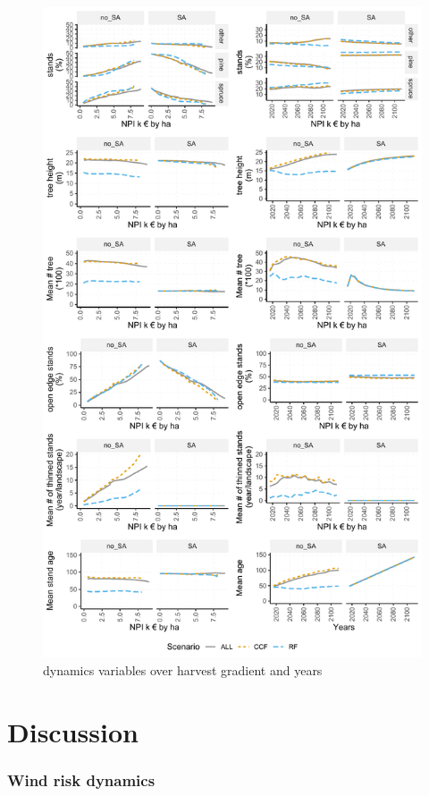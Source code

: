 \documentclass[]{elsarticle} %
\makeatletter
\def\maxwidth{\ifdim\Gin@nat@width>\linewidth\linewidth
\else\Gin@nat@width\fi}
\let\Oldincludegraphics\includegraphics
\renewcommand{\includegraphics}[1]{\Oldincludegraphics[width=\maxwidth]{#1}}
\makeatother
\begin{document}
\begin{figure}
\centering
\includegraphics{test_manus2_files/figure-latex/plot-dynamic-vars-1.pdf}
\caption{\label{fig:plot-dynamic-vars}dynamics variables over harvest
gradient and years}
\end{figure}

\section{Discussion}\label{discussion}

\subsubsection{Wind risk dynamics}\label{wind-risk-dynamics}
\end{document}
